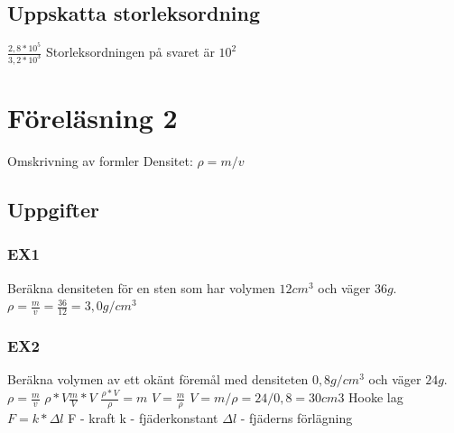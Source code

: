 \documentclass[a4paper,10pt]{article}
\begin{document}
\begin{flushleft}
  \subsection{Uppskatta storleksordning}
    $ \frac{2,8*10^5}{3,2*10^3} $\newline
    Storleksordningen på svaret är $ 10^2 $
\section{Föreläsning 2}
  Omskrivning av formler\newline
  Densitet: $ \rho = m/v $\newline
  \subsection{Uppgifter}
    \subsubsection{EX1}
    Beräkna densiteten för en sten som har volymen $ 12cm^3 $ och väger $ 36 g $.\newline
    $ \rho = \frac{m}{v} = \frac{36}{12} = 3,0g/cm^3 $\newline \newline
  \subsubsection{EX2}
    Beräkna volymen av ett okänt föremål med densiteten $ 0,8g/cm^3 $ och väger $ 24g $.\newline
    $ \rho = \frac{m}{v} $\newline
    $ \rho * V \frac{m}{V} * V $\newline
    $ \frac{\rho * V}{\rho} = m $\newline
    $ V = \frac{m}{\rho} $\newline
    $ V=m/\rho = 24/0,8 = 30cm3 $ \newline
    Hooke lag\newline
    $ F=k*\Delta l $\newline
    F - kraft\newline
    k - fjäderkonstant\newline
    $ \Delta l $ - fjäderns förlägning\newline

\end{flushleft}
\end{document}
